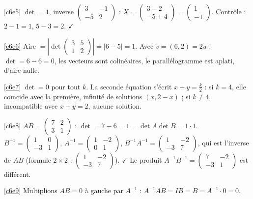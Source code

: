 \begin{corrige}{\ref{c6e5}}
$\det=1$, inverse $\begin{pmatrix}3&-1\\-5&2\end{pmatrix}$ : $X=\begin{pmatrix}3-2\\-5+4\end{pmatrix}=\begin{pmatrix}1\\-1\end{pmatrix}$. Contrôle : $2-1=1$, $5-3=2$. $\checkmark$
\end{corrige}
\begin{corrige}{\ref{c6e6}}
Aire $=|\det\begin{pmatrix}3&5\\1&2\end{pmatrix}|=|6-5|=1$. Avec $v=(6,2)=2u$ : $\det=6-6=0$, les vecteurs sont colinéaires, le parallélogramme est aplati, d'aire nulle.
\end{corrige}
\begin{corrige}{\ref{c6e7}}
$\det=0$ pour tout $k$. La seconde équation s'écrit $x+y=\frac k2$ : si $k=4$, elle coïncide avec la première, infinité de solutions $(x,2-x)$ ; si $k\ne4$, incompatible avec $x+y=2$, aucune solution.
\end{corrige}
\begin{corrige}{\ref{c6e8}}
$AB=\begin{pmatrix}7&2\\3&1\end{pmatrix}$ : $\det=7-6=1=\det A\det B=1\cdot1$. $B^{-1}=\begin{pmatrix}1&0\\-3&1\end{pmatrix}$, $A^{-1}=\begin{pmatrix}1&-2\\0&1\end{pmatrix}$, $B^{-1}A^{-1}=\begin{pmatrix}1&-2\\-3&7\end{pmatrix}$, qui est l'inverse de $AB$ (formule $2\times2$ : $\begin{pmatrix}1&-2\\-3&7\end{pmatrix}$). $\checkmark$ Le produit $A^{-1}B^{-1}=\begin{pmatrix}7&-2\\-3&1\end{pmatrix}$ est différent.
\end{corrige}
\begin{corrige}{\ref{c6e9}}
Multiplions $AB=0$ à gauche par $A^{-1}$ : $A^{-1}AB=IB=B=A^{-1}\cdot0=0$.
\end{corrige}
\else{}\fi

